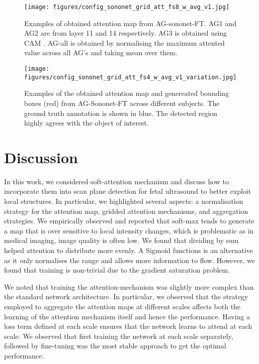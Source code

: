 \documentclass{article}
\begin{document}
\begin{figure}[!t]
	\centering
	\texttt{[image: figures/config\_sononet\_grid\_att\_fs8\_w\_avg\_v1.jpg]}
	\caption{Examples of obtained attention map from AG-sononet-FT. AG1 and AG2 are from layer 11 and 14 respectively. AG3 is obtained using CAM  \cite{zhou2016learning}. AG-all is obtained by normalising the maximum attented value across all AG's and taking mean over them.}
	\label{fig:attention_ag_sononet_ds}
\end{figure}

\begin{figure}[!t]
	\centering
	\texttt{[image: figures/config\_sononet\_grid\_att\_fs4\_w\_avg\_v1\_variation.jpg]}
	\caption{Examples of the obtained attention map and genereated bounding boxes (red) from AG-Sononet-FT across different subjects. The ground truth annotation is shown in blue. The detected region highly agrees with the object of interest.}
	\label{fig:attention_ag_sononet_ds_variation}
\end{figure}

\section{Discussion}

In this work, we considered soft-attention mechanism and discuss how to incorporate them into scan plane detection for fetal ultrasound to better exploit local structures. In particular, we highlighted several aspects: a normalisation strategy for the attention map, gridded attention mechanisms, and aggregation strategies. We empirically observed and reported that soft-max tends to generate a map that is over sensitive to local intensity changes, which is problematic as in medical imaging, image quality is often low. We found that dividing by sum helped attention to distribute more evenly. A Sigmoid functions is an alternative as it only normalises the range and allows more information to flow. However, we found that training is non-trivial due to the gradient saturation problem.

We noted that training the attention-mechanism was slightly more complex than the standard network architecture. In particular, we observed that the strategy employed to aggregate the attention maps at different scales affects both the learning of the attention mechanism itself and hence the performance. Having a loss term defined at each scale ensures that the network learns to attend at each scale. We observed that first training the network at each scale separately, followed by fine-tuning was the most stable approach to get the optimal performance. 
\end{document}
